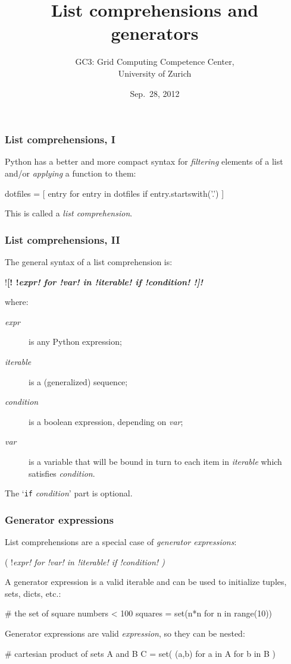 \documentclass[english,serif,mathserif,xcolor=pdftex,dvipsnames,table]{beamer}
\title[Part 7]{%
  List comprehensions and generators
}
\author[GC3]{%
  GC3: Grid Computing Competence Center, \\
  University of Zurich
}
\date{Sep.~28, 2012}
\begin{document}
\maketitle

\begin{frame}[fragile]
  \frametitle{List comprehensions, I}
  Python has a better and more compact syntax for \emph{filtering} elements
  of a list and/or \emph{applying} a function to them:
  \begin{python}
dotfiles = [ entry for entry in dotfiles 
             if entry.startswith('.') ]
  \end{python}
  
  \+ 
  This is called a \emph{list comprehension}.
\end{frame}


\begin{frame}[fragile]
  \frametitle{List comprehensions, II}
  \def\e{\ttfamily\itshape}
  
  The general syntax of a list comprehension is:
  \begin{python}
    !\bf[! !\e expr! for !\e var! in !\e iterable! if !\e condition! !\bf]!
  \end{python}
  where:
  \begin{description}
  \item[\e expr] is any Python expression;
  \item[\e iterable] is a (generalized) sequence;
  \item[\e condition] is a boolean expression, depending on
    {\e var};
  \item[\e var] is a variable that will be bound in turn to each item
    in {\e iterable} which satisfies {\e condition}.
  \end{description}

  \+
  The `{\lstinline|if| \e condition}' part is optional.
\end{frame}


\begin{frame}[fragile]
  \frametitle{Generator expressions}
  \def\e{\ttfamily\itshape}

  List comprehensions are a special case of \emph{generator expressions}:
  \begin{python}
    ( !\e expr! for !\e var! in !\e iterable! if !\e condition! )
  \end{python}

  \+
  A generator expression is a valid iterable and can be used to
  initialize tuples, sets, dicts, etc.:
  \begin{python}
    # the set of square numbers < 100
    squares = set(n*n for n in range(10))
  \end{python}

  \+
  Generator expressions are valid \emph{expression}, so they can be nested:
  \begin{python}
    # cartesian product of sets A and B
    C = set( (a,b) for a in A for b in B )
  \end{python}
\end{frame}
\end{document}
